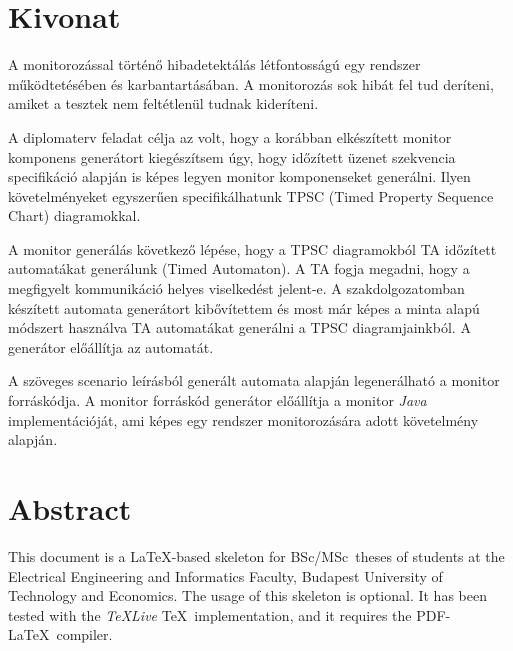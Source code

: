 \setcounter{page}{1}

\selecthungarian

\chapter*{Kivonat}

A monitorozással történő hibadetektálás létfontosságú egy rendszer működtetésében és karbantartásában.
A monitorozás sok hibát fel tud deríteni, amiket a tesztek nem feltétlenül tudnak kideríteni.

A diplomaterv feladat célja az volt, hogy a korábban elkészített monitor komponens generátort kiegészítsem úgy, hogy időzített üzenet szekvencia specifikáció alapján is képes legyen monitor komponenseket generálni.
Ilyen követelményeket egyszerűen specifikálhatunk TPSC (Timed Property Sequence Chart) diagramokkal.

A monitor generálás következő lépése, hogy a TPSC diagramokból TA időzített automatákat generálunk (Timed Automaton).
A TA fogja megadni, hogy a megfigyelt kommunikáció helyes viselkedést jelent-e.
A szakdolgozatomban készített automata generátort kibővítettem és most már képes a minta alapú módszert használva TA automatákat generálni a TPSC diagramjainkból.
A generátor előállítja az automatát.

A szöveges scenario leírásból generált automata alapján legenerálható a monitor forráskódja.
A monitor forráskód generátor előállítja a monitor \textit{Java} implementációját, ami képes egy rendszer monitorozására adott követelmény alapján.

\vfill
\selectenglish


\chapter*{Abstract}

This document is a \LaTeX-based skeleton for BSc/MSc~theses of students at the Electrical Engineering and Informatics Faculty, Budapest University of Technology and Economics. The usage of this skeleton is optional. It has been tested with the \emph{TeXLive} \TeX~implementation, and it requires the PDF-\LaTeX~compiler.


\vfill
\selectthesislanguage

\setcounter{romanPage}{\value{page}}
